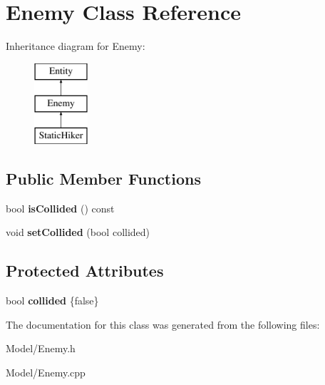 \hypertarget{class_enemy}{}\section{Enemy Class Reference}
\label{class_enemy}
Inheritance diagram for Enemy\+:\begin{figure}[H]
\begin{center}
\leavevmode
\includegraphics[height=3.000000cm]{class_enemy}
\end{center}
\end{figure}
\subsection*{Public Member Functions}
\begin{DoxyCompactItemize}
\item 
\mbox{\label{class_enemy_a5ab16abc0999c739837711ccb1718b7f}} 
bool {\bfseries is\+Collided} () const
\item 
\mbox{\label{class_enemy_a74b115235415b4a4aef5899055730cdb}} 
void {\bfseries set\+Collided} (bool collided)
\end{DoxyCompactItemize}
\subsection*{Protected Attributes}
\begin{DoxyCompactItemize}
\item 
\mbox{\label{class_enemy_a9371fe2a8eb2188d6cbb5ab1d9349f73}} 
bool {\bfseries collided} \{false\}
\end{DoxyCompactItemize}


The documentation for this class was generated from the following files\+:\begin{DoxyCompactItemize}
\item 
Model/Enemy.\+h\item 
Model/Enemy.\+cpp\end{DoxyCompactItemize}
